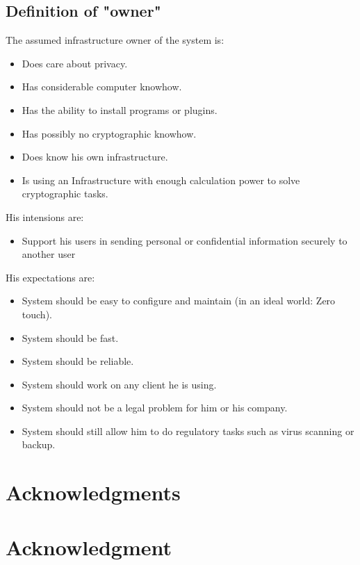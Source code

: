 \documentclass[12pt,journal,compsoc]{IEEEtran}
\begin{document}
\subsection{Definition of "owner"}
The assumed infrastructure owner of the system is:
\begin{itemize}
	\item Does care about privacy.
	\item Has considerable computer knowhow.
	\item Has the ability to install programs or plugins.
	\item Has possibly no cryptographic knowhow.
	\item Does know his own infrastructure.
	\item Is using an Infrastructure with enough calculation power to solve cryptographic tasks.
\end{itemize}
His intensions are:
\begin{itemize}
	\item Support his users in sending personal or confidential information securely to another user
\end{itemize}
His expectations are:
\begin{itemize}
	\item System should be easy to configure and maintain (in an ideal world: Zero touch). 
	\item System should be fast.
	\item System should be reliable.
	\item System should work on any client he is using.
	\item System should not be a legal problem for him or his company.
	\item System should still allow him to do regulatory tasks such as virus scanning or backup.
\end{itemize}


\ifCLASSOPTIONcompsoc
  \section*{Acknowledgments}
\else
  \section*{Acknowledgment}
\fi
\end{document}
